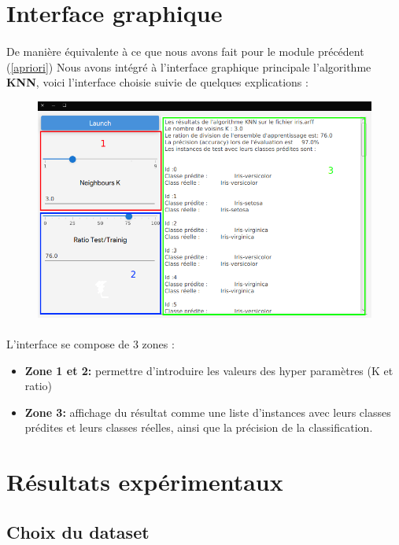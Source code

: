 	\section{Interface graphique}
		\paragraph{}
		De manière équivalente à ce que nous avons fait pour le module précédent (\ref{apriori}) Nous avons intégré à l'interface graphique principale l'algorithme \textbf{KNN}, voici l'interface choisie suivie de quelques explications : 
		\begin{figure}[H]
			\centering
			\includegraphics[width=0.75\linewidth]{knn/images/app.png}
		\end{figure}
		\paragraph{}
		L'interface se compose de 3 zones :
		\begin{itemize}
			\item \textbf{Zone 1 et 2:} permettre d'introduire les valeurs des hyper paramètres (K et ratio)
			\item \textbf{Zone 3:} affichage du résultat comme une liste d'instances avec leurs classes prédites et leurs classes réelles, ainsi que la précision de la classification. 
		\end{itemize}
	
	\section{Résultats expérimentaux}
		\subsection{Choix du dataset}
